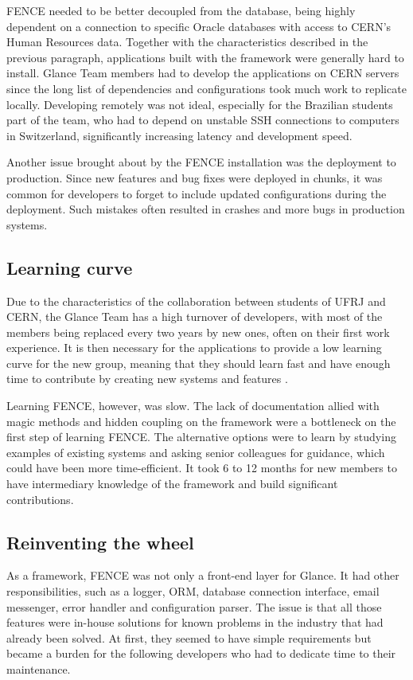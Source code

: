 FENCE needed to be better decoupled from the database, being highly dependent on a connection to specific Oracle databases with access to CERN's Human Resources data. Together with the characteristics described in the previous paragraph, applications built with the framework were generally hard to install. Glance Team members had to develop the applications on CERN servers since the long list of dependencies and configurations took much work to replicate locally. Developing remotely was not ideal, especially for the Brazilian students part of the team, who had to depend on unstable SSH connections to computers in Switzerland, significantly increasing latency and development speed. 

Another issue brought about by the FENCE installation was the deployment to production. Since new features and bug fixes were deployed in chunks, it was common for developers to forget to include updated configurations during the deployment. Such mistakes often resulted in crashes and more bugs in production systems.

\subsection{Learning curve}

Due to the characteristics of the collaboration between students of UFRJ and CERN, the Glance Team has a high turnover of developers, with most of the members being replaced every two years by new ones, often on their first work experience. It is then necessary for the applications to provide a low learning curve for the new group, meaning that they should learn fast and have enough time to contribute by creating new systems and features \cite{de-jesus-tcc}.

Learning FENCE, however, was slow. The lack of documentation allied with magic methods and hidden coupling on the framework were a bottleneck on the first step of learning FENCE. The alternative options were to learn by studying examples of existing systems and asking senior colleagues for guidance, which could have been more time-efficient. It took 6 to 12 months for new members to have intermediary knowledge of the framework and build significant contributions.

\subsection{Reinventing the wheel}

As a framework, FENCE was not only a front-end layer for Glance. It had other responsibilities, such as a logger, ORM, database connection interface, email messenger, error handler and configuration parser. The issue is that all those features were in-house solutions for known problems in the industry that had already been solved. At first, they seemed to have simple requirements but became a burden for the following developers who had to dedicate time to their maintenance.

